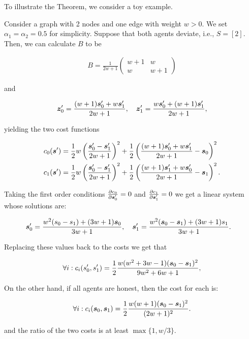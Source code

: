 To illustrate the Theorem, we consider a toy example. 
\begin{example}
    
Consider a graph with 2 nodes and one edge with weight $w > 0$. We set $\alpha_1 = \alpha_2 = 0.5$ for simplicity. Suppose that both agents deviate, i.e., $S = [2]$. Then, we can calculate $B$ to be 

\begin{align*}
    B = \frac {1} {2w + 1} \begin{pmatrix} w + 1 & w \\ w & w + 1 \end{pmatrix}
\end{align*}

and 

\begin{align}
    \bm{z}_0' = \frac {(w + 1) \bm{s}_0' + w \bm{s}_1'} {2w + 1}, \quad \bm{z}_1' = \frac {w \bm{s}_0' + (w + 1) \bm{s}_1'} {2w + 1},
\end{align}

yielding the two cost functions

\begin{align*}
    c_0(\bm{s}^\prime) & = \frac 1 2 w \left ( \frac {\bm{s}_0' - \bm{s}_1'} {2w + 1} \right )^2 + \frac 1 2 \left ( \frac {(w + 1) \bm{s}_0' + w \bm{s}_1'} {2w + 1} - \bm{s}_0 \right )^2 \\
    c_1(\bm{s}^\prime) & = \frac 1 2 w \left ( \frac {\bm{s}_0' - \bm{s}_1'} {2w + 1} \right )^2 + \frac 1 2 \left ( \frac {(w + 1) \bm{s}_1' + w \bm{s}_0'} {2w + 1} - \bm{s}_1 \right )^2.
\end{align*}

Taking the first order conditions $\frac {\partial c_0}{\partial \bm{s}_0'} = 0$ and $\frac {\partial c_1} {\partial \bm{s}_1'} = 0$ we get a linear system whose solutions are:  

\begin{align*}
\bm{s}_0^\prime & = \frac{w^2(s_0 - s_1) + (3w + 1) \bm{s}_0}{3w + 1}, \quad \bm{s}_1^\prime  = \frac{w^2(\bm{s}_0 - \bm{s}_1) + (3w + 1) s_1}{3w + 1}.
\end{align*}

Replacing these values back to the costs we get that 

\begin{align*}
\forall i: c_i(s_0^\prime, s_1^\prime) = \frac 1 2 \frac{w(w^2 + 3w - 1)(\bm{s}_0 - \bm{s}_1)^2}{9w^2 + 6w + 1},
\end{align*}

On the other hand, if all agents are honest, then the cost for each is: 

\begin{align*}
\forall i: c_i(\bm{s}_0, \bm{s}_1) = \frac 1 2 \frac{w(w+1)(\bm{s}_0 - \bm{s}_1)^2}{(2w + 1)^2}.    
\end{align*}

and the ratio of the two costs is at least $\max \{ 1, w / 3 \}$. 
\end{example}


